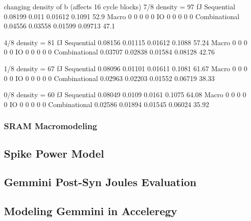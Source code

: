 \documentclass[sigconf]{acmart}
\begin{document}
changing density of b (affects 16 cycle blocks)
7/8 density = 97 fJ
Sequential                     0.08199        0.011       0.01612      0.1091        52.9
Macro                                0            0             0           0           0
IO                                   0            0             0           0           0
Combinational                  0.04556      0.03558       0.01599     0.09713        47.1

4/8 density = 81 fJ
Sequential                     0.08156      0.01115       0.01612      0.1088       57.24
Macro                                0            0             0           0           0
IO                                   0            0             0           0           0
Combinational                  0.03707      0.02838       0.01584     0.08128       42.76

1/8 density = 67 fJ
Sequential                     0.08096      0.01101       0.01611      0.1081       61.67
Macro                                0            0             0           0           0
IO                                   0            0             0           0           0
Combinational                  0.02963      0.02203       0.01552     0.06719       38.33

0/8 density = 60 fJ
Sequential                     0.08049       0.0109        0.0161      0.1075       64.08
Macro                                0            0             0           0           0
IO                                   0            0             0           0           0
Combinational                  0.02586      0.01894       0.01545     0.06024       35.92
\fi

\subsubsection{SRAM Macromodeling}


\subsection{Spike Power Model}

\subsection{Gemmini Post-Syn Joules Evaluation}

\subsection{Modeling Gemmini in Acceleregy}
\end{document}
